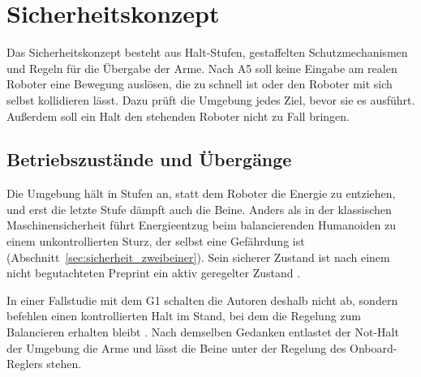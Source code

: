 \section{Sicherheitskonzept}
\label{sec:sicherheitskonzept}
Das Sicherheitskonzept besteht aus Halt-Stufen, gestaffelten Schutzmechanismen und Regeln für die Übergabe der Arme.
Nach A5 soll keine Eingabe am realen Roboter eine Bewegung auslösen, die zu schnell ist oder den Roboter mit sich selbst kollidieren lässt. Dazu prüft die Umgebung jedes Ziel, bevor sie es ausführt.
Außerdem soll ein Halt den stehenden Roboter nicht zu Fall bringen.

\subsection{Betriebszustände und Übergänge}
\label{sec:zustaende}

Die Umgebung hält in Stufen an, statt dem Roboter die Energie zu entziehen, und erst die letzte Stufe dämpft auch die Beine.
Anders als in der klassischen Maschinensicherheit \cite{Ding2026} führt Energieentzug beim balancierenden Humanoiden zu einem unkontrollierten Sturz, der selbst eine Gefährdung ist \cite{Ding2026} (Abschnitt~\ref{sec:sicherheit_zweibeiner}).
Sein sicherer Zustand ist nach einem nicht begutachteten Preprint ein aktiv geregelter Zustand \cite{Ding2026}.

In einer Fallstudie mit dem G1 schalten die Autoren deshalb nicht ab, sondern befehlen einen kontrollierten Halt im Stand, bei dem die Regelung zum Balancieren erhalten bleibt \cite{Ding2026}.
Nach demselben Gedanken entlastet der Not-Halt der Umgebung die Arme und lässt die Beine unter der Regelung des Onboard-Reglers stehen.

